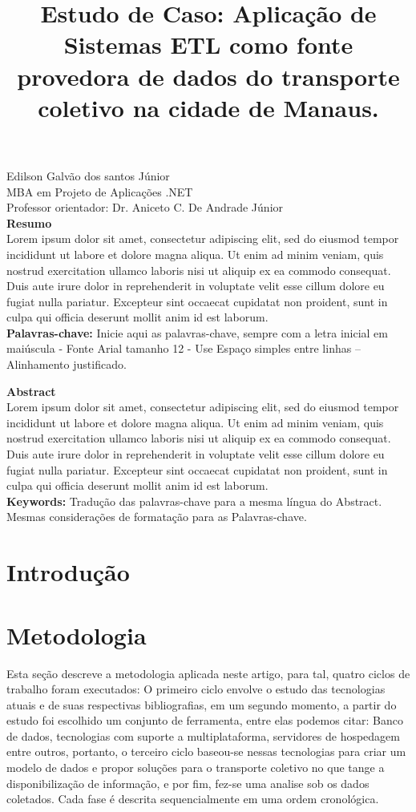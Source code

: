 \documentclass[12pt]{article}
\title{Estudo de Caso: Aplicação de Sistemas ETL como fonte provedora de dados do transporte coletivo na cidade de Manaus.}
\author{}
\begin{document}
 

\maketitle
\textit{}
\hspace*{\fill} Edilson Galvão dos santos Júnior\\
\hspace*{\fill} MBA em Projeto de Aplicações .NET\\
\hspace*{\fill} Professor orientador: Dr. Aniceto C. De Andrade Júnior\\

\noindent \textbf{Resumo}\\
Lorem ipsum dolor sit amet, consectetur adipiscing elit, sed do eiusmod tempor incididunt ut labore et dolore magna aliqua. Ut enim ad minim veniam, quis nostrud exercitation ullamco laboris nisi ut aliquip ex ea commodo consequat. Duis aute irure dolor in reprehenderit in voluptate velit esse cillum dolore eu fugiat nulla pariatur. Excepteur sint occaecat cupidatat non proident, sunt in culpa qui officia deserunt mollit anim id est laborum.\\
\textbf{Palavras-chave:} Inicie aqui as palavras-chave, sempre com a letra inicial em maiúscula - Fonte Arial tamanho 12 - Use Espaço simples entre linhas – Alinhamento justificado.

\noindent \textbf{Abstract}\\
Lorem ipsum dolor sit amet, consectetur adipiscing elit, sed do eiusmod tempor incididunt ut labore et dolore magna aliqua. Ut enim ad minim veniam, quis nostrud exercitation ullamco laboris nisi ut aliquip ex ea commodo consequat. Duis aute irure dolor in reprehenderit in voluptate velit esse cillum dolore eu fugiat nulla pariatur. Excepteur sint occaecat cupidatat non proident, sunt in culpa qui officia deserunt mollit anim id est laborum.\\
\textbf{Keywords:} Tradução das palavras-chave para a mesma língua do Abstract. Mesmas considerações de formatação para as Palavras-chave.

\section{Introdução}

\section{Metodologia} \label{sec:firstpage}
Esta seção descreve a metodologia aplicada neste artigo, para tal, quatro ciclos de trabalho foram executados: O primeiro ciclo envolve o estudo das tecnologias atuais e de suas respectivas bibliografias, em um segundo momento, a partir do estudo foi escolhido um conjunto de ferramenta, entre elas podemos citar: Banco de dados, tecnologias com suporte a multiplataforma, servidores de hospedagem entre outros, portanto, o terceiro ciclo baseou-se nessas tecnologias para criar um modelo de dados e propor soluções para o transporte coletivo no que tange a disponibilização de informação, e por fim, fez-se uma analise sob os dados coletados. Cada fase é descrita sequencialmente em uma ordem cronológica. 
\end{document}
